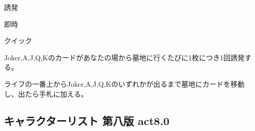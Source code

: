 \documentclass[letterpaper,10pt,dvipdfmx]{sphinxmanual}
\begin{document}
\sphinxAtStartPar
{} 誘発

\sphinxAtStartPar
{} 即時

\sphinxAtStartPar
{} クイック

\sphinxAtStartPar
{}

\sphinxAtStartPar
Joker,A,J,Q,Kのカードがあなたの場から墓地に行くたびに1枚につき1回誘発する。

\sphinxAtStartPar
{}

\sphinxAtStartPar
ライフの一番上からJoker,A,J,Q,Kのいずれかが出るまで墓地にカードを移動し、出たら手札に加える。


\subsection{キャラクターリスト 第八版 act8.0}
\label{\detokenize{auto/actionlist:id42}}
\end{document}
